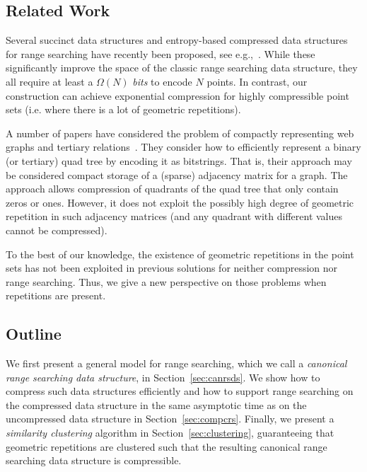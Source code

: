 \subsection{Related Work} 
Several succinct data structures and entropy-based compressed data structures for range searching have recently been proposed, see e.g.,~\cite{makinen2007rank, bose2009succinct, barbay2010compact, farzan2014entropy}. While these significantly improve the space of the classic range searching data structure, they all require at least a $\Omega(N)$ \emph{bits} to encode $N$ points. In contrast, our construction can achieve exponential compression for highly compressible point sets (i.e. where there is a lot of geometric repetitions). 

A number of papers have considered the problem of compactly representing web graphs and tertiary relations~\cite{brisaboa2009k2, brisaboaainterleaved, de2013compact}. They consider how to efficiently represent a binary (or tertiary) quad tree by encoding it as bitstrings. That is, their approach may be considered compact storage of a (sparse) adjacency matrix for a graph. The approach allows compression of quadrants of the quad tree that only contain zeros or ones. However, it does not exploit the possibly high degree of geometric repetition in such adjacency matrices (and any quadrant with different values cannot be compressed).

To the best of our knowledge, the existence of geometric repetitions in the point sets has not been exploited in previous solutions for neither compression nor range searching. Thus, we give a new perspective on those problems when repetitions are present. 

\subsection{Outline}
We first present a general model for range searching, which we call a \emph{canonical range searching data structure}, in Section~\ref{sec:canrsds}. We show how to compress such data structures efficiently and how to support range searching on the compressed data structure in the same asymptotic time as on the uncompressed data structure in Section~\ref{sec:compcrs}. Finally, we present a \emph{similarity clustering} algorithm in Section~\ref{sec:clustering}, guaranteeing that geometric repetitions are clustered such that the resulting canonical range searching data structure is compressible.


